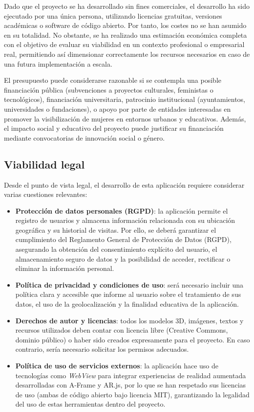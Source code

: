 Dado que el proyecto se ha desarrollado sin fines comerciales, el desarrollo ha sido ejecutado por una única persona, utilizando licencias gratuitas, versiones académicas o software de código abierto. Por tanto, los costes no se han asumido en su totalidad. No obstante, se ha realizado una estimación económica completa con el objetivo de evaluar su viabilidad en un contexto profesional o empresarial real, permitiendo así dimensionar correctamente los recursos necesarios en caso de una futura implementación a escala.

El presupuesto puede considerarse razonable si se contempla una posible financiación pública (subvenciones a proyectos culturales, feministas o tecnológicos), financiación universitaria, patrocinio institucional (ayuntamientos, universidades o fundaciones), o apoyo por parte de entidades interesadas en promover la visibilización de mujeres en entornos urbanos y educativos. Además, el impacto social y educativo del proyecto puede justificar su financiación mediante convocatorias de innovación social o género.

\subsection{Viabilidad legal}

Desde el punto de vista legal, el desarrollo de esta aplicación requiere considerar varias cuestiones relevantes:

\begin{itemize}
\item \textbf{Protección de datos personales (RGPD)}: la aplicación permite el registro de usuarios y almacena información relacionada con su ubicación geográfica y su historial de visitas. Por ello, se deberá garantizar el cumplimiento del Reglamento General de Protección de Datos (RGPD), asegurando la obtención del consentimiento explícito del usuario, el almacenamiento seguro de datos y la posibilidad de acceder, rectificar o eliminar la información personal.
\item \textbf{Política de privacidad y condiciones de uso}: será necesario incluir una política clara y accesible que informe al usuario sobre el tratamiento de sus datos, el uso de la geolocalización y la finalidad educativa de la aplicación.

\item \textbf{Derechos de autor y licencias}: todos los modelos 3D, imágenes, textos y recursos utilizados deben contar con licencia libre (Creative Commons, dominio público) o haber sido creados expresamente para el proyecto. En caso contrario, sería necesario solicitar los permisos adecuados.

\item \textbf{Política de uso de servicios externos}: la aplicación hace uso de tecnologías como \textit{WebView} para integrar experiencias de realidad aumentada desarrolladas con A-Frame y AR.js, por lo que se han respetado sus licencias de uso (ambas de código abierto bajo licencia MIT), garantizando la legalidad del uso de estas herramientas dentro del proyecto.
\end{itemize}

